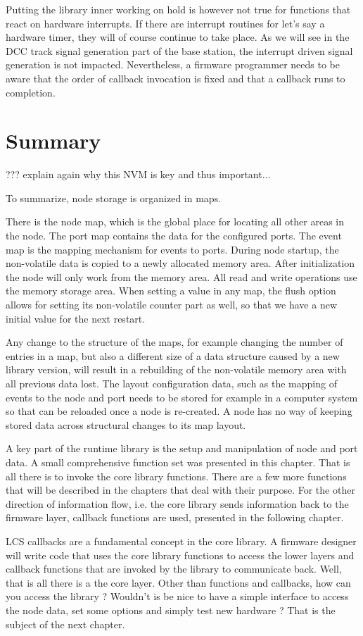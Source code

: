 Putting the library inner working on hold is however not true for functions that react on hardware interrupts. If there are interrupt routines for let's say a hardware timer, they will of course continue to take place. As we will see in the DCC track signal generation part of the base station, the interrupt driven signal generation is not impacted. Nevertheless, a firmware programmer needs to be aware that the order of callback invocation is fixed and that a callback runs to completion.



\section{Summary}

??? explain again why this NVM is key and thus important...

To summarize, node storage is organized in maps. 

There is the node map, which is the global place for locating all other areas in the node. The port map contains the data for the configured ports. The event map is the mapping mechanism for events to ports. During node startup, the non-volatile data is copied to a newly allocated memory area. After initialization the node will only work from the memory area. All read and write operations use the memory storage area. When setting a value in any map, the flush option allows for setting its non-volatile counter part as well, so that we have a new initial value for the next restart.

Any change to the structure of the maps, for example changing the number of entries in a map, but also a different size of a data structure caused by a new library version, will result in a rebuilding of the non-volatile memory area with all previous data lost. The layout configuration data, such as the mapping of events to the node and port needs to be stored for example in a computer system so that can be reloaded once a node is re-created. A node has no way of keeping stored data across structural changes to its map layout.

A key part of the runtime library is the setup and manipulation of node and port data. A small comprehensive function set was presented in this chapter. That is all there is to invoke the core library functions. There are a few more functions that will be described in the chapters that deal with their purpose. For the other direction of information flow, i.e. the core library sends information back to the firmware layer, callback functions are used, presented in the following chapter.

LCS callbacks are a fundamental concept in the core library. A firmware designer will write code that uses the core library functions to access the lower layers and callback functions that are invoked by the library to communicate back. Well, that is all there is a the core layer. Other than functions and callbacks, how can you access the library ? Wouldn't is be nice to have a simple interface to access the node data, set some options and simply test new hardware ? That is the subject of the next chapter.



